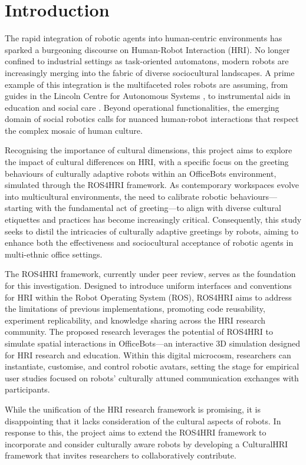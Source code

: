 
\chapter{Introduction}

The rapid integration of robotic agents into human-centric environments has sparked a burgeoning discourse on Human-Robot Interaction (HRI). No longer confined to industrial settings as task-oriented automatons, modern robots are increasingly merging into the fabric of diverse sociocultural landscapes. A prime example of this integration is the multifaceted roles robots are assuming, from guides in the Lincoln Centre for Autonomous Systems \cite{lincoln2018}, to instrumental aids in education and social care \cite{soriano2022}. Beyond operational functionalities, the emerging domain of social robotics calls for nuanced human-robot interactions that respect the complex mosaic of human culture.

Recognising the importance of cultural dimensions, this project aims to explore the impact of cultural differences on HRI, with a specific focus on the greeting behaviours of culturally adaptive robots within an OfficeBots environment, simulated through the ROS4HRI framework. As contemporary workspaces evolve into multicultural environments, the need to calibrate robotic behaviours---starting with the fundamental act of greeting---to align with diverse cultural etiquettes and practices has become increasingly critical. Consequently, this study seeks to distil the intricacies of culturally adaptive greetings by robots, aiming to enhance both the effectiveness and sociocultural acceptance of robotic agents in multi-ethnic office settings.

The ROS4HRI framework, currently under peer review, serves as the foundation for this investigation. Designed to introduce uniform interfaces and conventions for HRI within the Robot Operating System (ROS), ROS4HRI aims to address the limitations of previous implementations, promoting code reusability, experiment replicability, and knowledge sharing across the HRI research community. The proposed research leverages the potential of ROS4HRI to simulate spatial interactions in OfficeBots---an interactive 3D simulation designed for HRI research and education. Within this digital microcosm, researchers can instantiate, customise, and control robotic avatars, setting the stage for empirical user studies focused on robots' culturally attuned communication exchanges with participants.

While the unification of the HRI research framework is promising, it is disappointing that it lacks consideration of the cultural aspects of robots. In response to this, the project aims to extend the ROS4HRI framework to incorporate and consider culturally aware robots by developing a CulturalHRI framework that invites researchers to collaboratively contribute.